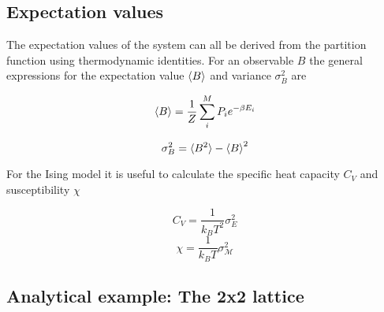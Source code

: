 \documentclass[11pt]{article}
\begin{document}
\subsection*{Expectation values}
\begin{flushleft}

The expectation values of the system can all be derived from the partition function using thermodynamic identities. For an observable $B$ the general expressions for the expectation value $\braket{B}$ and variance $\sigma_B^2$ are

\begin{equation}\label{expectation}
\braket{B} = \frac{1}{Z} \sum_i^M P_i e^{- \beta E_i}
\end{equation} 

\begin{equation}\label{variance}
\sigma_B^2 = \braket{B^2} - \braket{B}^2 
\end{equation}

For the Ising model it is useful to calculate the specific heat capacity $C_V$ and susceptibility $\chi$

\begin{equation}\label{Cv exp}
C_V = \frac{1}{k_B T^2} \sigma_E^2
\end{equation}
\begin{equation}\label{X exp}
\chi = \frac{1}{k_B T} \sigma_{\mathcal{M}}^2
\end{equation}



\end{flushleft}

\subsection{Analytical example: The 2x2 lattice}
\end{document}
